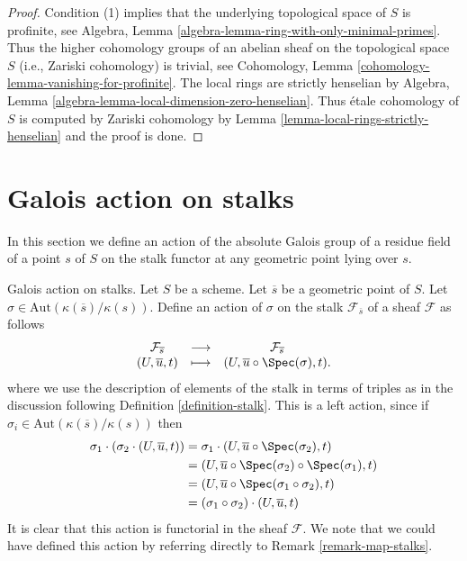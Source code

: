 \begin{proof}
Condition (1) implies that the underlying topological space
of $S$ is profinite, see
Algebra, Lemma \ref{algebra-lemma-ring-with-only-minimal-primes}.
Thus the higher cohomology groups of an abelian sheaf on the topological
space $S$ (i.e., Zariski cohomology) is trivial, see
Cohomology, Lemma \ref{cohomology-lemma-vanishing-for-profinite}.
The local rings are strictly henselian by
Algebra, Lemma \ref{algebra-lemma-local-dimension-zero-henselian}.
Thus \'etale cohomology of $S$ is computed by Zariski cohomology
by Lemma \ref{lemma-local-rings-strictly-henselian}
and the proof is done.
\end{proof}









\section{Galois action on stalks}
\label{section-galois-action-stalks}

\noindent
In this section we define an action of the absolute Galois group of a residue
field of a point $s$ of $S$ on the stalk functor at any geometric point lying
over $s$.

\medskip\noindent
Galois action on stalks.
Let $S$ be a scheme.
Let $\overline{s}$ be a geometric point of $S$.
Let $\sigma \in \text{Aut}(\kappa(\overline{s})/\kappa(s))$.
Define an action of $\sigma$ on the stalk $\mathcal{F}_{\overline{s}}$
of a sheaf $\mathcal{F}$ as follows
\begin{equation}
\label{equation-galois-action}
\begin{matrix}
\mathcal{F}_{\overline{s}} &
\longrightarrow &
\mathcal{F}_{\overline{s}} \\
(U, \overline{u}, t) &
\longmapsto &
(U, \overline{u} \circ \Spec(\sigma), t).
\end{matrix}
\end{equation}
where we use the description of elements of the stalk in terms of triples
as in the discussion following
Definition \ref{definition-stalk}.
This is a left action, since if
$\sigma_i \in \text{Aut}(\kappa(\overline{s})/\kappa(s))$
then
\begin{align*}
\sigma_1 \cdot (\sigma_2 \cdot (U, \overline{u}, t))
& =
\sigma_1 \cdot (U, \overline{u} \circ \Spec(\sigma_2), t) \\
& =
(U, \overline{u} \circ \Spec(\sigma_2) \circ \Spec(\sigma_1), t) \\
& =
(U, \overline{u} \circ \Spec(\sigma_1 \circ \sigma_2), t) \\
& =
(\sigma_1 \circ \sigma_2) \cdot (U, \overline{u}, t)
\end{align*}
It is clear that this action is functorial in the sheaf $\mathcal{F}$.
We note that we could have defined this action by referring directly to
Remark \ref{remark-map-stalks}.

